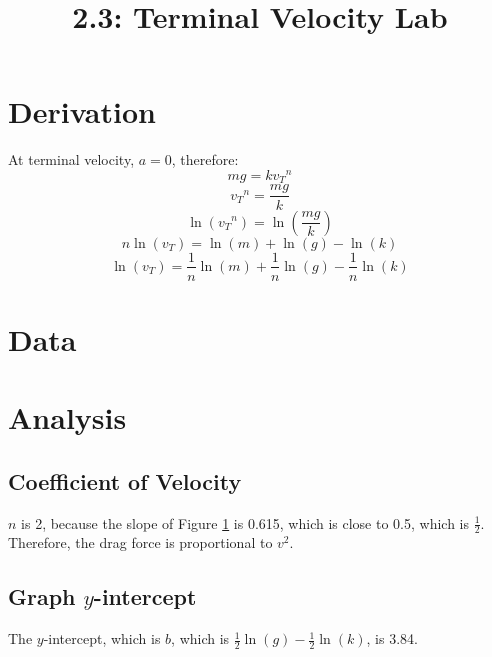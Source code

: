 \documentclass{article}
\title{2.3: Terminal Velocity Lab}
\begin{document}
\section{Derivation}
At terminal velocity, $a = 0$, therefore:
\[mg = k{v_T}^n\]
\[{v_T}^n = \frac{mg}{k}\]
\[\ln({v_T}^n) = \ln(\frac{mg}{k})\]
\[n\ln(v_T) = \ln(m) + \ln(g) - \ln(k)\]
\[\ln(v_T) = \frac{1}{n}\ln(m) + \frac{1}{n}\ln(g) - \frac{1}{n}\ln(k)\]
\section{Data}
\begin{center}
\end{center}

\begin{figure}[H]
    \centering
    \label{figure:velocity}
\end{figure}

\section{Analysis}
\subsection{Coefficient of Velocity}
$n$ is 2, because the slope of Figure \ref{figure:velocity} is 0.615, which is close to 0.5, which is $\frac{1}{2}$. Therefore, the drag force is proportional to $v^2$.
\subsection{Graph $y$-intercept}
The $y$-intercept, which is $b$, which is $\frac{1}{2}\ln(g) - \frac{1}{2}\ln(k)$, is 3.84.
\end{document}

